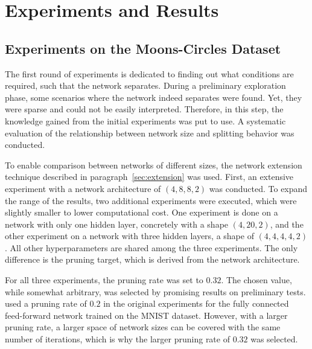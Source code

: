 \chapter{Experiments and Results}

\section{Experiments on the Moons-Circles Dataset}
The first round of experiments is dedicated to finding out what conditions are required, such that the network separates.
During a preliminary exploration phase, some scenarios where the network indeed separates were found.
Yet, they were sparse and could not be easily interpreted.
Therefore, in this step, the knowledge gained from the initial experiments was put to use.
A systematic evaluation of the relationship between network size and splitting behavior was conducted.

To enable comparison between networks of different sizes, the network extension technique described in paragraph~\ref{sec:extension} was used.
First, an extensive experiment with a network architecture of $(4,8,8,2)$ was conducted.
To expand the range of the results, two additional experiments were executed, which were slightly smaller to lower computational cost.
One experiment is done on a network with only one hidden layer, concretely with a shape $(4,20,2)$, and the other experiment on a network with three hidden layers, a shape of $(4,4,4,4,2)$.
All other hyperparameters are shared among the three experiments.
The only difference is the pruning target, which is derived from the network architecture.

For all three experiments, the pruning rate was set to $0.32$.
The chosen value, while somewhat arbitrary, was selected by promising results on preliminary tests.
\textcite{LTH} used a pruning rate of $0.2$ in the original experiments for the fully connected feed-forward network trained on the MNIST dataset.
However, with a larger pruning rate, a larger space of network sizes can be covered with the same number of iterations, which is why the larger pruning rate of $0.32$ was selected.

